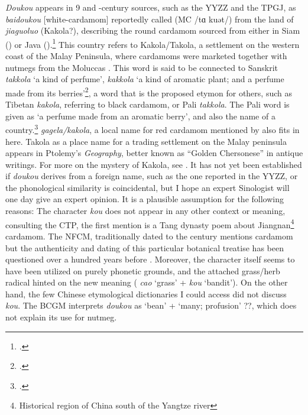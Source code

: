 \textit{Doukou} appears in 9 and -century sources, such as the \gls{YYZZ} and the \gls{TPGJ}, as  \textit{baidoukou} [white-cardamom] reportedly called  (\gls{MC} /tɑ kuət/) from the land of  \textit{jiaguoluo} (Kakola?), describing the round cardamom sourced from either in Siam () or Java ().\footcite[18:55]{yyzz} This country refers to Kakola/Takola, a settlement on the western coast of the Malay Peninsula, where cardamoms were marketed together with nutmegs from the Moluccas \autocite[22]{donkin_between_2003}. This word is said to be connected to Sanskrit  \textit{takkola} `a kind of perfume',  \textit{kakkola} `a kind of aromatic plant; and a perfume made from its berries'\footcite[431,241]{monier-williams_sanskrit-english_1899}, a word that is the proposed etymon for others, such as Tibetan  
\textit{kakola}, referring to black cardamom, or Pali \textit{takkola}. The Pali word is given as `a perfume made from an aromatic berry', and also the name of a country.\footcites[292]{pali_text_society_pali_1921}[59]{trenckner_pali_1879}  \textit{gagela/kakola}, a local name for red cardamom mentioned by \textcite{hu_food_2005} also fits in here. Takola as a place name for a trading settlement on the Malay peninsula appears in Ptolemy's \textit{Geography}, better known as ``Golden Chersonese'' in antique writings. For more on the mystery of Kakola, see \textcite{wheatley_golden_1961}. It has not yet been established if \textit{doukou} derives from a foreign name, such as the one reported in the \gls{YYZZ}, or the phonological similarity is coincidental, but I hope an expert Sinologist will one day give an expert opinion. It is a plausible assumption for the following reasons: The character  \textit{kou} does not appear in any other context or meaning, consulting the \gls{CTP}, the first mention is a Tang dynasty poem about Jiangnan\footnote{Historical region of China south of the Yangtze river} cardamom. The \gls{NFCM}, traditionally dated to the  century \BC{} mentions cardamom but the authenticity and dating of this particular botanical treatise has been questioned over a hundred years before \autocite{ma_authenticity_1978}. Moreover, the character itself seems to have been utilized on purely phonetic grounds, and the attached grass/herb radical hinted on the new meaning ( \textit{cao} `grass' +  \textit{kou} `bandit'). On the other hand, the few Chinese etymological dictionaries I could access did not discuss \textit{kou}. The \gls{BCGM} interprets \textit{doukou} as `bean' + `many; profusion' ??, which does not explain its use for nutmeg.

